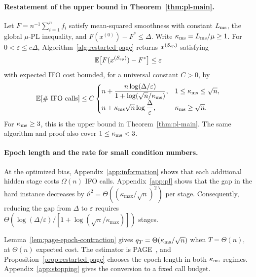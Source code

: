 \documentclass{article}
\newcommand{\E}{\mathbb{E}}
\theoremstyle{definition}
\begin{document}
\paragraph{Restatement of the upper bound in
Theorem~\ref{thm:pl-main}.}
Let $F=n^{-1}\sum_{i=1}^nf_i$ satisfy mean-squared smoothness with constant
$L_{\rm ms}$, the global $\mu$-PL inequality, and
$F(x^{(0)})-F^*\le\Delta$.  Write
$\kappa_{\rm ms}=L_{\rm ms}/\mu\ge1$.  For
$0<\varepsilon\le c\Delta$, Algorithm~\ref{alg:restarted-page} returns
$x^{(S_{\rm ep})}$ satisfying
\begin{equation}
 \E\bigl[F(x^{(S_{\rm ep})})-F^*\bigr]\le\varepsilon
 \label{eq:restated-page-target}
\end{equation}
with expected IFO cost bounded, for a universal constant $C>0$, by
\begin{equation}
 \E[\#\text{ IFO calls}]
 \le C\begin{cases}
 \displaystyle
 n+\dfrac{n\log(\Delta/\varepsilon)}
 {1+\log(\sqrt n/\kappa_{\rm ms})},
 &1\le\kappa_{\rm ms}\le\sqrt n,\\[2mm]
 \displaystyle
 n+\kappa_{\rm ms}\sqrt n
 \log\frac{\Delta}{\varepsilon},
 &\kappa_{\rm ms}\ge\sqrt n.
 \end{cases}
 \label{eq:restated-page-cost}
\end{equation}
For $\kappa_{\rm ms}\ge3$, this is the upper bound in
Theorem~\ref{thm:pl-main}.  The same algorithm and proof also cover
$1\le\kappa_{\rm ms}<3$.

\paragraph{Epoch length and the rate for small condition numbers.}
At the optimized bias, Appendix~\ref{app:information} shows that each additional
hidden stage costs $\Omega(n)$ IFO calls.  Appendix~\ref{app:pl} shows that the
gap in the hard instance decreases by
$\vartheta^2=\Theta((\kappa_{\max}/\sqrt n)^2)$ per stage.  Consequently, reducing
the gap from $\Delta$ to $\varepsilon$ requires
$\Theta(\log(\Delta/\varepsilon)/[1+\log(\sqrt n/\kappa_{\max})])$ stages.

Lemma~\ref{lem:page-epoch-contraction} gives
$q_T=\Theta(\kappa_{\rm ms}/\sqrt n)$ when $T=\Theta(n)$, at $\Theta(n)$
expected cost.  The estimator is PAGE~\citep{li2021page}, and
Proposition~\ref{prop:restarted-page} chooses the epoch length in both
$\kappa_{\rm ms}$ regimes.
Appendix~\ref{app:stopping} gives the conversion to a fixed call budget.
\end{document}
